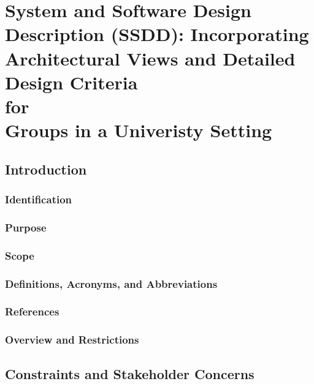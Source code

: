 \documentclass[12pt, oneside, letterpaper]{report}
\begin{document}
\part{System and Software Design Description (SSDD): Incorporating
     Architectural Views and Detailed Design Criteria \\ for \\ Groups in a
     Univeristy Setting}
\tableofcontents                                %
\listoffigures
\listoftables
\chapter{Introduction}
	\section{Identification}
		
	\section{Purpose}
		
	\section{Scope}
		
	\section{Definitions, Acronyms, and Abbreviations}
		
	\section{References}
		
	\section{Overview and Restrictions}
		

\nopagebreak
\chapter{Constraints and Stakeholder Concerns}
\end{document}
